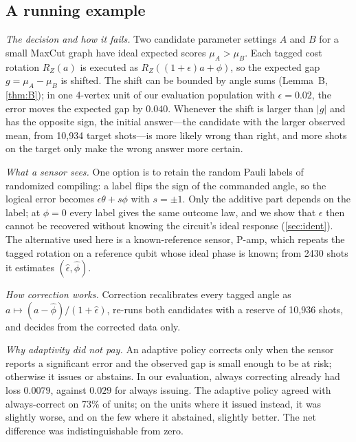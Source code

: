 \documentclass[10pt,twocolumn]{article}
\theoremstyle{definition}
\theoremstyle{remark}
\newcommand{\eps}{\epsilon}
\newcommand{\RZ}{R_Z}
\begin{document}
\subsection{A running example}\label{sec:example}
\emph{The decision and how it fails.} Two candidate parameter settings $A$ and $B$ for a small MaxCut graph have ideal expected scores $\mu_A>\mu_B$. Each tagged cost rotation $\RZ(a)$ is executed as $\RZ((1+\eps)a+\phi)$, so the expected gap $g=\mu_A-\mu_B$ is shifted. The shift can be bounded by angle sums (Lemma~B, \cref{thm:B}); in one 4-vertex unit of our evaluation population with $\eps=0.02$, the error moves the expected gap by $0.040$. Whenever the shift is larger than $|g|$ and has the opposite sign, the initial answer---the candidate with the larger observed mean, from 10{,}934 target shots---is more likely wrong than right, and more shots on the target only make the wrong answer more certain.

\emph{What a sensor sees.} One option is to retain the random Pauli labels of randomized compiling: a label flips the sign of the commanded angle, so the logical error becomes $\eps\theta+s\phi$ with $s=\pm1$. Only the additive part depends on the label; at $\phi=0$ every label gives the same outcome law, and we show that $\eps$ then cannot be recovered without knowing the circuit's ideal response (\cref{sec:ident}). The alternative used here is a known-reference sensor, P-amp, which repeats the tagged rotation on a reference qubit whose ideal phase is known; from 2430 shots it estimates $(\hat\eps,\hat\phi)$.

\emph{How correction works.} Correction recalibrates every tagged angle as $a\mapsto(a-\hat\phi)/(1+\hat\eps)$, re-runs both candidates with a reserve of 10{,}936 shots, and decides from the corrected data only.

\emph{Why adaptivity did not pay.} An adaptive policy corrects only when the sensor reports a significant error and the observed gap is small enough to be at risk; otherwise it issues or abstains. In our evaluation, always correcting already had loss $0.0079$, against $0.029$ for always issuing. The adaptive policy agreed with always-correct on 73\% of units; on the units where it issued instead, it was slightly worse, and on the few where it abstained, slightly better. The net difference was indistinguishable from zero.
\end{document}
